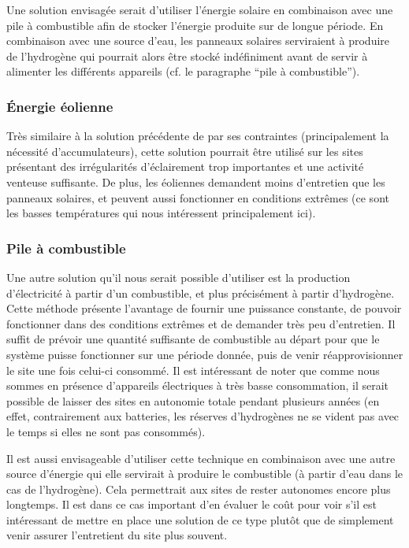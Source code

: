 Une solution envisagée serait d’utiliser l’énergie solaire en combinaison avec une pile à combustible afin de stocker l’énergie produite sur de longue période. En combinaison avec une source d’eau, les panneaux solaires serviraient à produire de l’hydrogène qui pourrait alors être stocké indéfiniment avant de servir à alimenter les différents appareils (cf. le paragraphe “pile à combustible”).

\subsubsection{Énergie éolienne}

Très similaire à la solution précédente de par ses contraintes (principalement la nécessité d’accumulateurs), cette solution pourrait être utilisé sur les sites présentant des irrégularités d’éclairement trop importantes et une activité venteuse suffisante. De plus, les éoliennes demandent moins d’entretien que les panneaux solaires, et peuvent aussi fonctionner en conditions extrêmes (ce sont les basses températures qui nous intéressent principalement ici).

\subsubsection{Pile à combustible}

Une autre solution qu’il nous serait possible d’utiliser est la production d’électricité à partir d’un combustible, et plus précisément à partir d’hydrogène. Cette méthode présente l’avantage de fournir une puissance constante, de pouvoir fonctionner dans des conditions extrêmes et de demander très peu d’entretien. Il suffit de prévoir une quantité suffisante de combustible au départ pour que le système puisse fonctionner sur une période donnée, puis de venir réapprovisionner le site une fois celui-ci consommé. Il est intéressant de noter que comme nous sommes en présence d’appareils électriques à très basse consommation, il serait possible de laisser des sites en autonomie totale pendant plusieurs années (en effet, contrairement aux batteries, les réserves d’hydrogènes ne se vident pas avec le temps si elles ne sont pas consommés).

Il est aussi envisageable d’utiliser cette technique en combinaison avec une autre source d’énergie qui elle servirait à produire le combustible (à partir d’eau dans le cas de l’hydrogène). Cela permettrait aux sites de rester autonomes encore plus longtemps. Il est dans ce cas important d’en évaluer le coût pour voir s’il est intéressant de mettre en place une solution de ce type plutôt que de simplement venir assurer l’entretient du site plus souvent.

